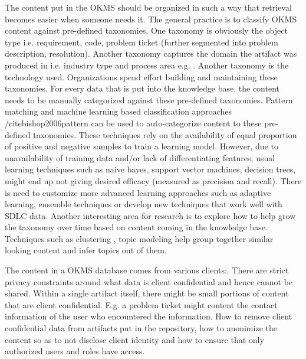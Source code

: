The content put in the OKMS should be organized in such a way that retrieval becomes easier when someone needs it. The general practice is to classify OKMS content against pre-defined taxonomies. One taxonomy is obviously the object type i.e. requirement, code, problem ticket (further segmented into problem description, resolution). Another taxonomy captures the domain the artifact was produced in i.e. industry type and process area e.g. \cite{apqc,bph}. Another taxonomy is the technology used. Organizations spend effort building and maintaining these taxonomies. For every data that is put into the knowledge base, the content needs to be manually categorized against these pre-defined taxonomies. Pattern matching and machine learning based classification approaches /cite{bishop2006pattern} can be used to auto-categorize content to these pre-defined taxonomies. These techniques rely on the availability of equal proportion of positive and negative samples to train a learning model. However, due to unavailability of training data and/or lack of differentiating features, usual learning techniques such as naive bayes, support vector machines, decision trees, might end up not giving desired efficacy (measured as precision and recall). There is need to customize more advanced learning approaches such as adaptive learning, ensemble techniques or develop new techniques that work well with SDLC data. Another interesting area for research is to explore how to help grow the taxonomy over time based on content coming in the knowledge base. Techniques such as clustering \cite{Berkhin06}, topic modeling \cite{Blei:2012} help group together similar looking content and infer topics out of them. 

The content in a OKMS database comes from various clients:. There are strict privacy constraints around what data is client confidential and hence cannot be shared. Within a single artifact itself, there might be small portions of content that are client confidential. E.g. a problem ticket might content the contact information of the user who encountered the information. How to remove client confidential data from artifacts put in the repository, how to anonimize the content so as to not disclose client identity and how to ensure that only authorized users and roles have access.

